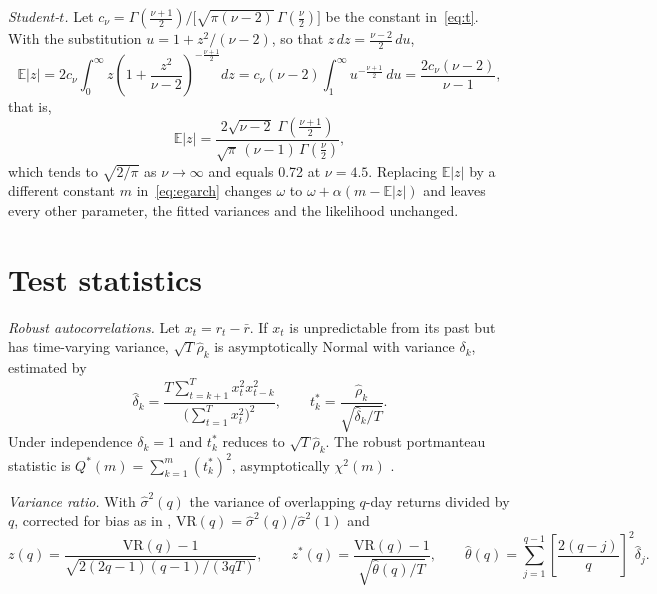 \documentclass[11pt,a4paper]{article}
\newcommand{\E}{\mathbb{E}}
\newcommand{\VR}{\mathrm{VR}}
\begin{document}
\emph{Student-$t$.} Let $c_\nu=\Gamma\!\left(\frac{\nu+1}{2}\right)\big/\bigl[\sqrt{\pi(\nu-2)}\,\Gamma\!\left(\frac{\nu}{2}\right)\bigr]$ be the constant in~\eqref{eq:t}. With the substitution $u=1+z^{2}/(\nu-2)$, so that $z\,dz=\frac{\nu-2}{2}\,du$,
\begin{equation}
\E|z|=2c_\nu\int_{0}^{\infty}z\left(1+\frac{z^{2}}{\nu-2}\right)^{-\frac{\nu+1}{2}}dz
=c_\nu(\nu-2)\int_{1}^{\infty}u^{-\frac{\nu+1}{2}}\,du=\frac{2c_\nu(\nu-2)}{\nu-1},
\end{equation}
that is,
\begin{equation}
\E|z|=\frac{2\sqrt{\nu-2}\;\Gamma\!\left(\frac{\nu+1}{2}\right)}{\sqrt{\pi}\,(\nu-1)\,\Gamma\!\left(\frac{\nu}{2}\right)} ,
\end{equation}
which tends to $\sqrt{2/\pi}$ as $\nu\to\infty$ and equals 0.72 at $\nu=4.5$. Replacing $\E|z|$ by a different constant $m$ in~\eqref{eq:egarch} changes $\omega$ to $\omega+\alpha(m-\E|z|)$ and leaves every other parameter, the fitted variances and the likelihood unchanged.

\section{Test statistics}\label{app:tests}

\emph{Robust autocorrelations.} Let $x_t=r_t-\bar r$. If $x_t$ is unpredictable from its past but has time-varying variance, $\sqrt{T}\hat\rho_k$ is asymptotically Normal with variance $\delta_k$, estimated by \citep{lomackinlay1988}
\begin{equation}
\hat\delta_k=\frac{T\sum_{t=k+1}^{T}x_t^2x_{t-k}^2}{\bigl(\sum_{t=1}^{T}x_t^2\bigr)^{2}},\qquad t^{*}_k=\frac{\hat\rho_k}{\sqrt{\hat\delta_k/T}} .
\end{equation}
Under independence $\delta_k=1$ and $t_k^{*}$ reduces to $\sqrt{T}\hat\rho_k$. The robust portmanteau statistic is $Q^{*}(m)=\sum_{k=1}^{m}(t_k^{*})^2$, asymptotically $\chi^2(m)$ \citep{lobato2001}.

\emph{Variance ratio.} With $\hat\sigma^2(q)$ the variance of overlapping $q$-day returns divided by $q$, corrected for bias as in \citet{lomackinlay1988}, $\VR(q)=\hat\sigma^2(q)/\hat\sigma^2(1)$ and
\begin{equation}
z(q)=\frac{\VR(q)-1}{\sqrt{2(2q-1)(q-1)/(3qT)}},\qquad
z^{*}(q)=\frac{\VR(q)-1}{\sqrt{\hat\theta(q)/T}},\qquad
\hat\theta(q)=\sum_{j=1}^{q-1}\left[\frac{2(q-j)}{q}\right]^{2}\hat\delta_j .
\end{equation}
\end{document}
